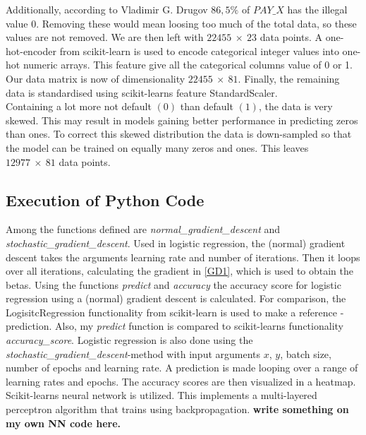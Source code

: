 \documentclass[a4paper,11pt,twocolumn]{article}
\begin{document}
Additionally, according to Vladimir G. Drugov \cite{vladimir} $86,5 \%$ of $PAY\_X$ has the illegal value 0. 
Removing these would mean loosing too much of the total data, so these values are not removed. We are then left with $22455\: \times\: 23$ data points.
A one-hot-encoder from scikit-learn is used to encode categorical integer values into one-hot numeric arrays. This feature give all the categorical columns value of 0 or 1. Our data matrix is now of dimensionality $22455\: \times\: 81$. Finally, the remaining data is standardised using scikit-learns feature StandardScaler. 
\\ 
Containing a lot more not default $(0)$ than default $(1)$, the data is very skewed. This may result in models gaining better performance in predicting zeros than ones. To correct this skewed distribution the data is down-sampled so that the model can be trained on equally many zeros and ones. This leaves $12977\: \times\: 81$ data points. 

\subsection{Execution of Python Code}

Among the functions defined are \textit{normal\_gradient\_descent} and \textit{stochastic\_gradient\_descent}. Used in logistic regression, the (normal) gradient descent takes the arguments learning rate and number of iterations. Then it loops over all iterations, calculating the gradient in \eqref{GD1}, which is used to obtain the betas. Using the functions \textit{predict} and \textit{accuracy} the accuracy score for logistic regression using a (normal) gradient descent is calculated. For comparison, the LogisitcRegression functionality from scikit-learn is used to make a reference - prediction. Also, my \textit{predict} function is compared to scikit-learns functionality \textit{accuracy\_score}. 
Logistic regression is also done using the \textit{stochastic\_gradient\_descent}-method with input arguments $x$, $y$, batch size, number of epochs and learning rate. A prediction is made looping over a range of learning rates and epochs. The accuracy scores are then visualized in a heatmap.
Scikit-learns neural network is utilized. This implements a multi-layered perceptron algorithm that trains using backpropagation. 
\textbf{write something on my own NN code here.}    
\end{document}
